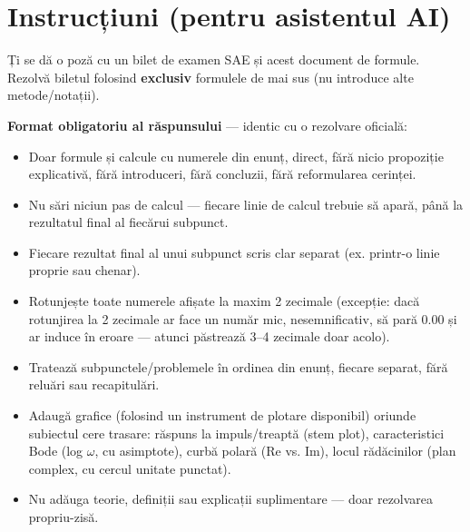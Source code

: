 \documentclass[8.2pt,a4paper,twocolumn]{extarticle}
\begin{document}
\section*{Instrucțiuni (pentru asistentul AI)}
\begin{res}
Ți se dă o poză cu un bilet de examen SAE și acest document de formule. Rezolvă biletul folosind \textbf{exclusiv} formulele de mai sus (nu introduce alte metode/notații).

\textbf{Format obligatoriu al răspunsului} --- identic cu o rezolvare oficială:
\begin{itemize}[leftmargin=1.1em]
\item Doar formule și calcule cu numerele din enunț, direct, fără nicio propoziție explicativă, fără introduceri, fără concluzii, fără reformularea cerinței.
\item Nu sări niciun pas de calcul --- fiecare linie de calcul trebuie să apară, până la rezultatul final al fiecărui subpunct.
\item Fiecare rezultat final al unui subpunct scris clar separat (ex. printr-o linie proprie sau chenar).
\item Rotunjește toate numerele afișate la maxim 2 zecimale (excepție: dacă rotunjirea la 2 zecimale ar face un număr mic, nesemnificativ, să pară 0.00 și ar induce în eroare --- atunci păstrează 3--4 zecimale doar acolo).
\item Tratează subpunctele/problemele în ordinea din enunț, fiecare separat, fără reluări sau recapitulări.
\item Adaugă grafice (folosind un instrument de plotare disponibil) oriunde subiectul cere trasare: răspuns la impuls/treaptă (stem plot), caracteristici Bode (log $\omega$, cu asimptote), curbă polară (Re vs. Im), locul rădăcinilor (plan complex, cu cercul unitate punctat).
\item Nu adăuga teorie, definiții sau explicații suplimentare --- doar rezolvarea propriu-zisă.
\end{itemize}
\end{res}
\end{document}
